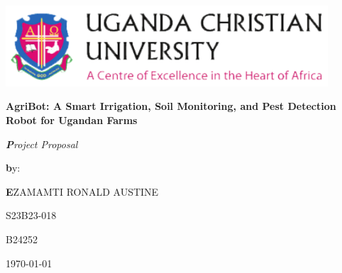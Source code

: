 \documentclass[12pt,a4paper]{report}
\begin{document}
\begin{titlepage}
    \centering
    \includegraphics[width=0.9\textwidth]{img/UCU.png}\\
    \vspace*{2cm}
    {\Huge\bfseries AgriBot: A Smart Irrigation, Soil Monitoring, and Pest Detection Robot for Ugandan Farms\par}
    \vspace{2cm}
    {\LARGE\itshape\textbf Project Proposal\par}
    \vspace{2cm}
    {\Large\textbf by:\par}
    \vspace{1cm}
    {\Large\textbf EZAMAMTI RONALD AUSTINE \par}
    \vspace{0.5cm}
    {\large S23B23-018\par}
    \vspace{0.5cm}
    {\large B24252\par}
    \vspace{1.5cm}
    {\large \today\par}
\end{titlepage}
\end{document}
